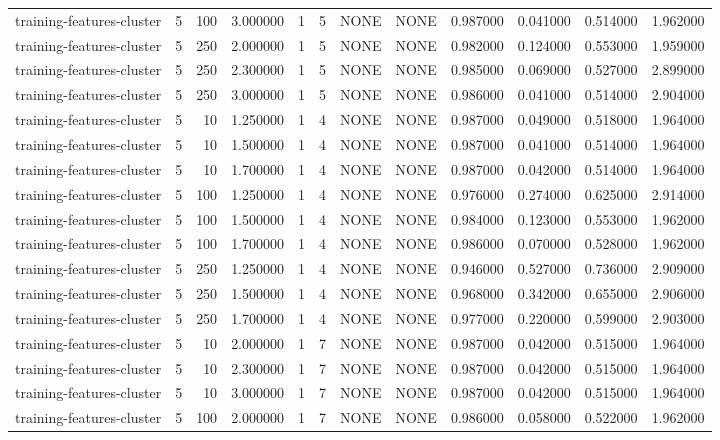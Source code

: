 \begin{tabular}{lrrrllllrrrr}
training-features-cluster & 5 & 100 & 3.000000 & 1 & 5 & NONE & NONE & 0.987000 & 0.041000 & 0.514000 & 1.962000 \\
training-features-cluster & 5 & 250 & 2.000000 & 1 & 5 & NONE & NONE & 0.982000 & 0.124000 & 0.553000 & 1.959000 \\
training-features-cluster & 5 & 250 & 2.300000 & 1 & 5 & NONE & NONE & 0.985000 & 0.069000 & 0.527000 & 2.899000 \\
training-features-cluster & 5 & 250 & 3.000000 & 1 & 5 & NONE & NONE & 0.986000 & 0.041000 & 0.514000 & 2.904000 \\
training-features-cluster & 5 & 10 & 1.250000 & 1 & 4 & NONE & NONE & 0.987000 & 0.049000 & 0.518000 & 1.964000 \\
training-features-cluster & 5 & 10 & 1.500000 & 1 & 4 & NONE & NONE & 0.987000 & 0.041000 & 0.514000 & 1.964000 \\
training-features-cluster & 5 & 10 & 1.700000 & 1 & 4 & NONE & NONE & 0.987000 & 0.042000 & 0.514000 & 1.964000 \\
training-features-cluster & 5 & 100 & 1.250000 & 1 & 4 & NONE & NONE & 0.976000 & 0.274000 & 0.625000 & 2.914000 \\
training-features-cluster & 5 & 100 & 1.500000 & 1 & 4 & NONE & NONE & 0.984000 & 0.123000 & 0.553000 & 1.962000 \\
training-features-cluster & 5 & 100 & 1.700000 & 1 & 4 & NONE & NONE & 0.986000 & 0.070000 & 0.528000 & 1.962000 \\
training-features-cluster & 5 & 250 & 1.250000 & 1 & 4 & NONE & NONE & 0.946000 & 0.527000 & 0.736000 & 2.909000 \\
training-features-cluster & 5 & 250 & 1.500000 & 1 & 4 & NONE & NONE & 0.968000 & 0.342000 & 0.655000 & 2.906000 \\
training-features-cluster & 5 & 250 & 1.700000 & 1 & 4 & NONE & NONE & 0.977000 & 0.220000 & 0.599000 & 2.903000 \\
training-features-cluster & 5 & 10 & 2.000000 & 1 & 7 & NONE & NONE & 0.987000 & 0.042000 & 0.515000 & 1.964000 \\
training-features-cluster & 5 & 10 & 2.300000 & 1 & 7 & NONE & NONE & 0.987000 & 0.042000 & 0.515000 & 1.964000 \\
training-features-cluster & 5 & 10 & 3.000000 & 1 & 7 & NONE & NONE & 0.987000 & 0.042000 & 0.515000 & 1.964000 \\
training-features-cluster & 5 & 100 & 2.000000 & 1 & 7 & NONE & NONE & 0.986000 & 0.058000 & 0.522000 & 1.962000 \\

\end{tabular}
